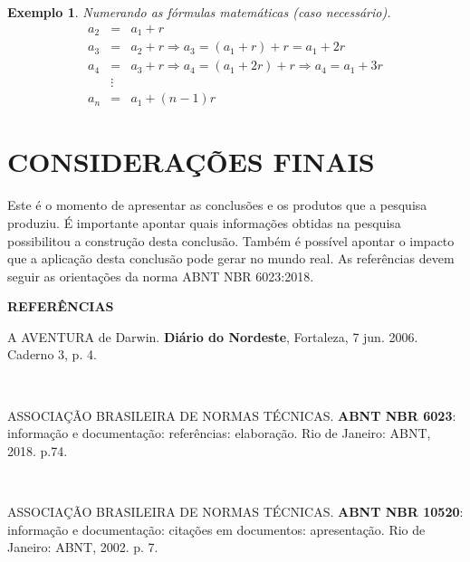 \documentclass[12pt]{article}
\newtheorem{exem}{Exemplo}
\begin{document}
\begin{exem}
	Numerando as fórmulas matemáticas (caso necessário).
	\begin{eqnarray}
	a_2 &=& a_1+r \nonumber \\
	a_3 &=& a_2  +r \Rightarrow a_3= \left(a_1+r\right)+r=a_1+2r \nonumber \\
	a_4 &=& a_3  +r \Rightarrow a_4=\left(a_1+2r\right)+r\Rightarrow a_4 = a_1+3r \nonumber \\
	&\vdots& \nonumber \\
	a_n&=&a_1+\left(n-1\right)r 
\end{eqnarray}	
	
\end{exem}                                                                                                                              

\section{\large CONSIDERAÇÕES FINAIS}

Este é o momento de apresentar as conclusões e os produtos que a pesquisa produziu. É importante apontar quais informações obtidas na pesquisa possibilitou a construção desta conclusão. Também é possível apontar o impacto que a aplicação desta conclusão pode gerar no mundo real. As referências devem seguir as orientações da norma ABNT NBR 6023:2018.




\begin{center}
	\textbf{REFERÊNCIAS}
\end{center}


\begin{flushleft}
A AVENTURA de Darwin. \textbf{Diário do Nordeste}, Fortaleza, 7 jun. 2006. Caderno 3, p. 4.
	
\

ASSOCIAÇÃO BRASILEIRA DE NORMAS TÉCNICAS. \textbf{ABNT NBR 6023}: informação e documentação: referências: elaboração. Rio de Janeiro: ABNT, 2018.  p.74.

\

ASSOCIAÇÃO BRASILEIRA DE NORMAS TÉCNICAS. \textbf{ABNT NBR 10520}: informação e  documentação: citações em documentos: apresentação. Rio de Janeiro: ABNT, 2002. p. 7.


\end{flushleft}
\end{document}
